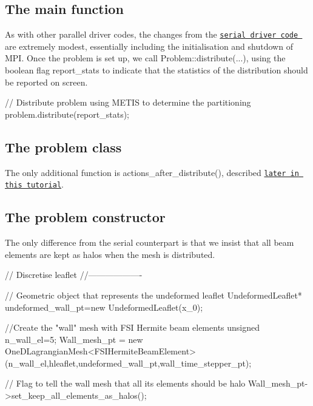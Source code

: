 \hypertarget{index_main_body}{}\subsection{The main function}\label{index_main_body}
As with other parallel driver codes, the changes from the \href{../../../interaction/fsi_channel_with_leaflet/html/index.html}{\tt serial driver code } are extremely modest, essentially including the initialisation and shutdown of M\+PI. Once the problem is set up, we call {\ttfamily Problem\+::distribute}(...), using the boolean flag {\ttfamily report\+\_\+stats} to indicate that the statistics of the distribution should be reported on screen.

 
\begin{DoxyCodeInclude}
   \textcolor{comment}{// Distribute problem using METIS to determine the partitioning}
   problem.distribute(report\_stats);

\end{DoxyCodeInclude}




\hypertarget{index_problem_class}{}\subsection{The problem class}\label{index_problem_class}
The only additional function is {\ttfamily actions\+\_\+after\+\_\+distribute()}, described \href{#actions_routines}{\tt later in this tutorial}.



\hypertarget{index_constructor}{}\subsection{The problem constructor}\label{index_constructor}
The only difference from the serial counterpart is that we insist that all beam elements are kept as halos when the mesh is distributed.

 
\begin{DoxyCodeInclude}
 \textcolor{comment}{// Discretise leaflet}
 \textcolor{comment}{//-------------------}

 \textcolor{comment}{// Geometric object that represents the undeformed leaflet}
 UndeformedLeaflet* undeformed\_wall\_pt=\textcolor{keyword}{new} UndeformedLeaflet(x\_0);

 \textcolor{comment}{//Create the "wall" mesh with FSI Hermite beam elements}
 \textcolor{keywordtype}{unsigned} n\_wall\_el=5;
 Wall\_mesh\_pt = \textcolor{keyword}{new} OneDLagrangianMesh<FSIHermiteBeamElement>
  (n\_wall\_el,hleaflet,undeformed\_wall\_pt,wall\_time\_stepper\_pt);

 \textcolor{comment}{// Flag to tell the wall mesh that all its elements should be halo}
 Wall\_mesh\_pt->set\_keep\_all\_elements\_as\_halos();

\end{DoxyCodeInclude}




